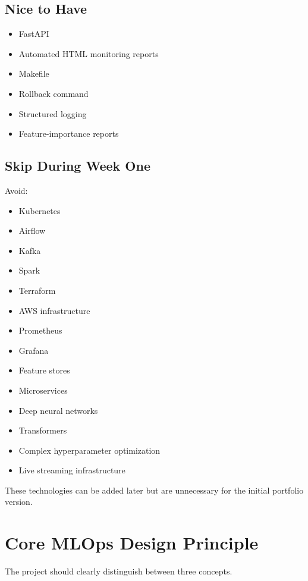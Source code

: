 \documentclass[11pt,a4paper]{article}
\begin{document}
\subsection{Nice to Have}

\begin{itemize}
    \item FastAPI
    \item Automated HTML monitoring reports
    \item Makefile
    \item Rollback command
    \item Structured logging
    \item Feature-importance reports
\end{itemize}

\subsection{Skip During Week One}

Avoid:

\begin{itemize}
    \item Kubernetes
    \item Airflow
    \item Kafka
    \item Spark
    \item Terraform
    \item AWS infrastructure
    \item Prometheus
    \item Grafana
    \item Feature stores
    \item Microservices
    \item Deep neural networks
    \item Transformers
    \item Complex hyperparameter optimization
    \item Live streaming infrastructure
\end{itemize}

These technologies can be added later but are unnecessary for the initial portfolio version.

\section{Core MLOps Design Principle}

The project should clearly distinguish between three concepts.
\end{document}
